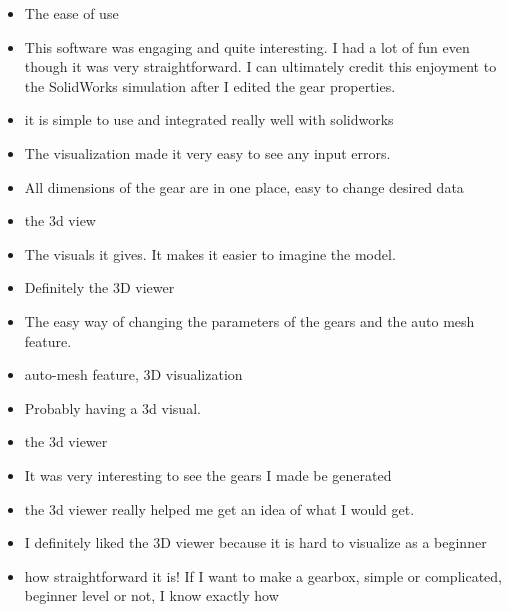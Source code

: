 \begin{itemize}
\item The ease of use
\item This software was engaging and quite interesting. I had a lot of fun even though it was very straightforward. I can ultimately credit this enjoyment to the SolidWorks simulation after I edited the gear properties.
\item it is simple to use and integrated really well with solidworks 
\item The visualization made it very easy to see any input errors. 
\item All dimensions of the gear are in one place, easy to change desired data
\item the 3d view
\item The visuals it gives. It makes it easier to imagine the model.
\item Definitely the 3D viewer
\item The easy way of changing the parameters of the gears and the auto mesh feature.
\item auto-mesh feature, 3D visualization
\item Probably having a 3d visual.
\item the 3d viewer
\item It was very interesting to see the gears I made be generated
\item the 3d viewer really helped me get an idea of what I would get. 
\item I definitely liked the 3D viewer because it is hard to visualize as a beginner
\item how straightforward it is! If I want to make a gearbox, simple or complicated, beginner level or not, I know exactly how
\end{itemize}
